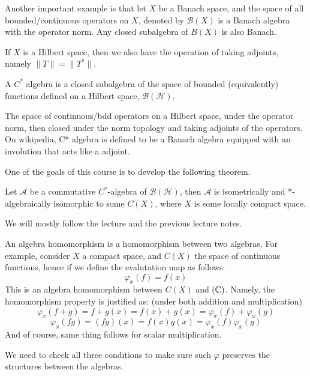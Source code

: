 Another important example is that let $X$ be a Banach space, and the space of all bounded/continuous operators on $X$, denoted by $\mathcal{B}(X)$ is a Banach algebra with the operator norm. Any closed subalgebra of $B(X)$ is also Banach.

If $X$ is a Hilbert space, then we also have the operation of taking adjoints, namely $\|T\|=\|T^*\|$.

\begin{definition}
    A $C^*$ algebra is a closed subalgebra of the space of bounded (equivalently) functions defined on a Hilbert space, $\mathcal{B}(\mathcal{H})$. 
\end{definition}
\begin{remark}
    The space of continuous/bdd operators on a Hilbert space, under the operator norm, then closed under the norm topology and taking adjoints of the operators. On wikipedia, C* algebra is defined to be a Banach algebra equipped with an involution that acts like a adjoint.
\end{remark}


One of the goals of this course is to develop the following theorem.
\begin{theorem}
    Let $\mathcal{A}$ be a commutative $C^*$-algebra of $\mathcal{B}(\mathcal{H})$, then $\mathcal{A}$ is isometrically and *-algebraically isomorphic to some $C(X)$, where $X$ is some locally compact space.
\end{theorem}


We will mostly follow the lecture and the previous lecture notes.
\begin{definition}
    An algebra homomorphism is a homomorphism between two algebras. For example, consider $X$ a compact space, and $C(X)$ the space of continuous functions, hence if we define the evalutation map as follows:
    \begin{equation*}
        \varphi_x(f)=f(x)
    \end{equation*}
    This is an algebra homomorphism between $C(X)$ and $(\mathbb{C})$. Namely, the homomorphism property is justified as: (under both addition and multiplication)
    \begin{equation*}
        \varphi_x(f+g)=f+g(x)=f(x)+g(x)=\varphi_x(f)+\varphi_x(g)
    \end{equation*}
    \begin{equation*}
        \varphi_x(fg)=(fg)(x)=f(x)g(x)=\varphi_x(f)\varphi_x(g)
    \end{equation*}
    And of course, same thing follows for scalar multiplication. 
\end{definition}
\begin{remark}
    We need to check all three conditions to make sure such $\varphi$ preserves the structures between the algebras.
\end{remark}

